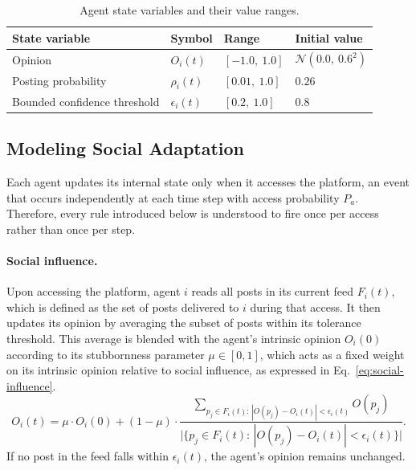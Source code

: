 \documentclass{svproc}
\def\Blue{\color[rgb]{0,0,1}}
\def\Black{\color[rgb]{0,0,0}}
\def\post{\rho}                 %
\def\BoundedConfidence{\epsilon} %
\def\feed{F}                    %
\def\Stubbornness{\mu}           %
\begin{document}

\begin{table}[t]\Blue
\centering
\caption{Agent state variables and their value
  ranges.}\label{tab:state}
\tabcolsep=5pt
\begin{tabular}{llll}
\toprule
State variable & Symbol & Range & Initial value \\
\midrule
Opinion & $O_i(t)$ & $[-1.0,\ 1.0]$ & $\mathcal{N}(0.0,\ 0.6^2)$ \\
Posting probability & $\post_i(t)$ & $[0.01,\ 1.0]$ & $0.26$ \\
Bounded confidence threshold & $\BoundedConfidence_i(t)$ & $[0.2,\ 1.0]$ & $0.8$ \\
\bottomrule
\end{tabular}\Black
\end{table}



\subsection{Modeling Social Adaptation}\label{sec:model-adaptation}
Each agent updates its internal state only when it accesses the
platform, an event that occurs independently at each time step with
access probability $P_a$. Therefore, every rule introduced below is
understood to fire once per access rather than once per step.
\par


\paragraph{Social influence.} 
Upon accessing the platform, agent $i$ reads all posts in its current
feed $\feed_i(t)$, which is defined as the set of posts delivered to
$i$ during that access. It then updates its opinion by averaging the
subset of posts within its tolerance threshold. This average is
blended with the agent's intrinsic opinion $O_i(0)$ according to its
stubbornness parameter $\Stubbornness\in[0,1]$, which acts as a fixed
weight on its intrinsic opinion relative to social influence, as
expressed in Eq.~\eqref{eq:social-influence}.
%
\begin{equation}
O_i(t) = \Stubbornness\cdot O_i(0) + (1-\Stubbornness)\cdot\frac{\sum_{p_j\in \feed_i(t):\,|O(p_j)-O_i(t)|<\BoundedConfidence_i(t)} O(p_j)}{\big|\{p_j\in \feed_i(t):\,|O(p_j)-O_i(t)|<\BoundedConfidence_i(t)\}\big|}.
\label{eq:social-influence}
\end{equation}
%
If no post in the feed
falls within $\BoundedConfidence_i(t)$, the agent's opinion remains
unchanged.
\end{document}
